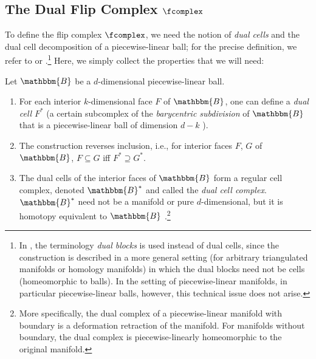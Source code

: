 \subsection{The Dual Flip Complex $\fcomplex$}
\label{sec:dual-complex}


To define the flip complex $\fcomplex$, we need the notion of \emph{dual cells} and the dual cell decomposition of a piecewise-linear ball; for the precise definition, we refer to \cite[Sec.~I.6]{Hudson:Piecewise-linear-topology-1969} or \cite[\S64 and \S70]{Munkres:Elements-of-algebraic-topology-1984}.\footnote{In \cite{Munkres:Elements-of-algebraic-topology-1984}, the terminology \emph{dual blocks} is used instead of dual cells, since the construction is described in a more general setting (for arbitrary triangulated manifolds or homology manifolds) in which the dual 
blocks need not be cells (homeomorphic to balls). In the setting of piecewise-linear manifolds, in particular piecewise-linear balls, however, this technical issue does not arise.}
Here, we simply collect the properties that we will need:


\begin{proposition} 
\label{prop-dual}
Let $\mathbbm{B}$ be a $d$-dimensional piecewise-linear ball.
\begin{enumerate}
\item For each interior $k$-dimensional face $F$ of $\mathbbm{B}$, one can define a \emph{dual cell} $F^*$ (a certain subcomplex of the \emph{barycentric subdivision} of 
$\mathbbm{B}$ that is a piecewise-linear ball of dimension $d-k$ \cite[Lemma~I.19]{Hudson:Piecewise-linear-topology-1969}).
\item The construction reverses inclusion, i.e., %
for interior faces $F$, $G$ of $\mathbbm{B}$,
$F\subseteq G$ iff $F^* \supseteq G^*$.
\item The dual cells of the %
interior faces of $\mathbbm{B}$ form a regular cell complex, denoted $\mathbbm{B}^*$ and called the \emph{dual cell complex}.
$\mathbbm{B}^*$ need not be a manifold or pure $d$-dimensional, but it is homotopy equivalent to $\mathbbm{B}$ \cite[Lem.~70.1]{Munkres:Elements-of-algebraic-topology-1984}.\footnote{More specifically, the dual complex of a piecewise-linear manifold with boundary is a deformation retraction of the manifold. For manifolds without boundary, the dual complex is piecewise-linearly homeomorphic to the original manifold.}
\end{enumerate}
\end{proposition}

